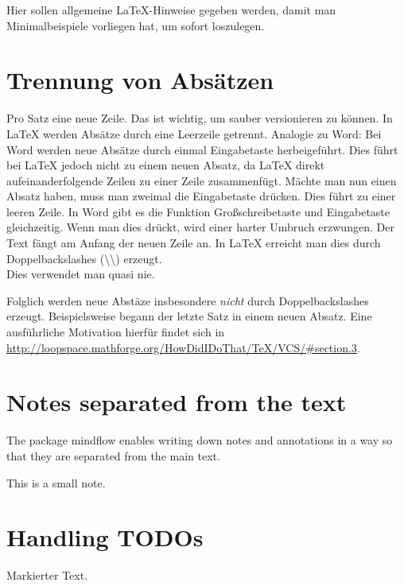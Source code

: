 \documentclass[
  fontsize=10pt,
  numbers=noenddot,
  english,  %
  paper=a5,
  twoside,  %
  DIV=calc,
  headings=small,
  bibliography=totoc,
  listof=totoc,
  draft=false
]{scrbook}
\theoremstyle{break}
\newcommand{\textmarker}[1]{{\color{red} #1}\xspace}
\begin{document}
Hier sollen allgemeine \LaTeX-Hinweise gegeben werden, damit man Minimalbeispiele vorliegen hat, um sofort loszulegen.

\section{Trennung von Absätzen}

\begin{ltgexample}
Pro Satz eine neue Zeile.
Das ist wichtig, um sauber versionieren zu können.
In LaTeX werden Absätze durch eine Leerzeile getrennt.
Analogie zu Word: Bei Word werden neue Absätze durch einmal Eingabetaste herbeigeführt.
Dies führt bei LaTeX jedoch nicht zu einem neuen Absatz, da LaTeX direkt aufeinanderfolgende Zeilen zu einer Zeile zusammenfügt.
Mächte man nun einen Absatz haben, muss man zweimal die Eingabetaste drücken.
Dies führt zu einer leeren Zeile.
In Word gibt es die Funktion Großschreibetaste und Eingabetaste gleichzeitig.
Wenn man dies drückt, wird einer harter Umbruch erzwungen.
Der Text fängt am Anfang der neuen Zeile an.
In LaTeX erreicht man dies durch Doppelbackslashes (\textbackslash\textbackslash) erzeugt.
\\
Dies verwendet man quasi nie.

Folglich werden neue Abstäze insbesondere \emph{nicht} durch Doppelbackslashes erzeugt.
Beispielsweise begann der letzte Satz in einem neuen Absatz.
Eine ausführliche Motivation hierfür findet sich in \url{http://loopspace.mathforge.org/HowDidIDoThat/TeX/VCS/#section.3}.
\end{ltgexample}


\section{Notes separated from the text}

The package mindflow enables writing down notes and annotations in a way so that they are separated from the main text.

\begin{ltgexample}
\begin{mindflow}
This is a small note.
\end{mindflow}
\end{ltgexample}

\section{Handling TODOs}

\begin{ltgexample}
\textmarker{Markierter Text.}
\end{ltgexample}
\end{document}
